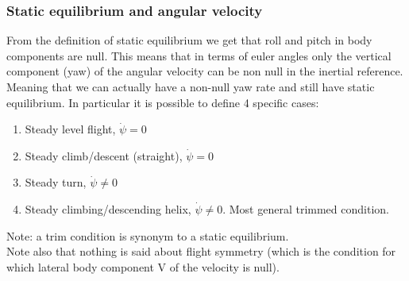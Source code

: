 \subsubsection{Static equilibrium and angular velocity}
From the definition of static equilibrium we get that roll and pitch in body components are null. This means that in terms of euler angles only the vertical component (yaw) of the angular velocity can be non null in the inertial reference. Meaning that we can actually have a non-null yaw rate and still have static equilibrium. In particular it is possible to define 4 specific cases:
\begin{enumerate}
    \item Steady level flight, $\dot \psi= 0$
    \item Steady climb/descent (straight), $\dot \psi= 0$
    \item Steady turn, $\dot \psi\neq 0$
    \item Steady climbing/descending helix, $\dot \psi\neq 0$. Most general trimmed condition.
\end{enumerate}

Note: a trim condition is synonym to a static equilibrium.\\
Note also that nothing is said about flight symmetry (which is the condition for which lateral body component V of the velocity is null).

